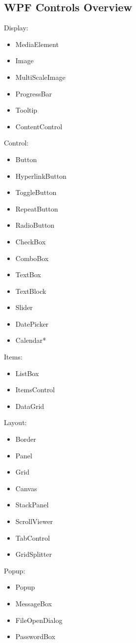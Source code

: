 \subsection{WPF Controls Overview}
\begin{multicols}{4}
Display:
\begin{itemize}
  \item MediaElement
  \item Image
  \item MultiScaleImage
  \item ProgressBar
  \item Tooltip
  \item ContentControl
\end{itemize}

Control:
\begin{itemize}
  \item Button
  \item HyperlinkButton
  \item ToggleButton
  \item RepeatButton
  \item RadioButton
  \item CheckBox
  \item ComboBox
  \item TextBox
  \item TextBlock
  \item Slider
  \item DatePicker
  \item Calendar*
\end{itemize}

Items:
\begin{itemize}
  \item ListBox
  \item ItemsControl
  \item DataGrid
\end{itemize}

Layout:
\begin{itemize}
  \item Border
  \item Panel
  \item Grid
  \item Canvas
  \item StackPanel
  \item ScrollViewer
  \item TabControl
  \item GridSplitter
\end{itemize}

Popup:
\begin{itemize}
  \item Popup
  \item MessageBox
  \item FileOpenDialog
  \item PasswordBox
\end{itemize}

\end{multicols}

